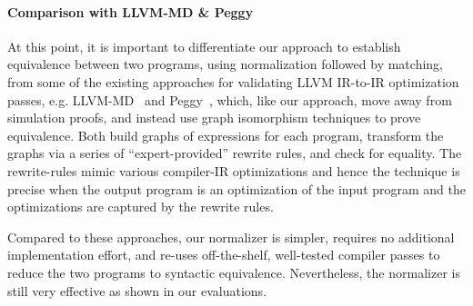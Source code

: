 \paragraph{Comparison with LLVM-MD \& Peggy}
At this point, it is important to differentiate our approach to establish 
equivalence between two \LLVM programs, using  normalization followed by 
matching, 
from some of the existing
approaches for validating LLVM IR-to-IR optimization
passes, e.g. LLVM-MD~\cite{Tristan:2011} and Peggy~\cite{Stepp:2011}, which, 
like our approach, move away from simulation proofs, and instead use graph 
isomorphism techniques to prove equivalence. 
Both build graphs of expressions for each program, 
transform the graphs via a series of ``expert-provided'' rewrite rules, and 
check for equality. The rewrite-rules mimic various compiler-IR optimizations 
and hence the technique is precise when the output program is an 
optimization of the input program and the optimizations are captured by the 
rewrite  rules. 

Compared to these approaches, our normalizer is simpler, requires no additional 
implementation effort, and re-uses off-the-shelf, well-tested compiler passes 
to reduce the two programs to syntactic equivalence. Nevertheless, the 
normalizer is still very effective as shown in our evaluations.






